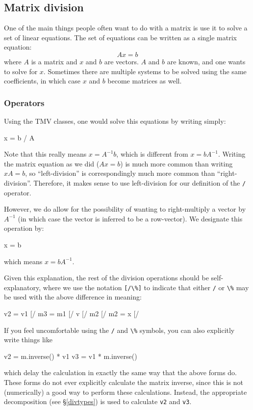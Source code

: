 \documentclass[twoside,letterpaper,11pt]{article}
\renewcommand{\tt}[1]{{\lstinline {#1}}}
\begin{document}
\subsection{Matrix division}
\label{division}

One of the main things people often want to do with a matrix is use it to solve a 
set of linear equations.  The set of equations can be written as a single matrix
equation:
\begin{equation*}
\nonumber
A x = b
\end{equation*}
where $A$ is a matrix and $x$ and $b$ are vectors.  $A$ and $b$ are known, 
and one wants to solve for $x$.  Sometimes there are
multiple systems to be solved using the same coefficients, in which case
$x$ and $b$ become matrices as well.

\subsubsection{Operators}
\label{divops}

Using the TMV classes, one would solve this equations by writing simply:
\begin{tmvcode}
x = b / A
\end{tmvcode}
Note that this really means $x = A^{-1} b$, which is different from $x = b A^{-1}$.
Writing the matrix equation as we did ($A x=b$) is much more common than 
writing $xA=b$, so ``left-division'' is correspondingly much more common than 
``right-division''.  Therefore, it makes sense to use left-division for our definition of the \tt{/}
operator.

However, we do allow for the possibility of wanting to right-multiply a vector
by $A^{-1}$ (in which case the vector is inferred to be a row-vector).  We designate
this operation by:
\begin{tmvcode}
x = b %
\end{tmvcode}
which means $x = b A^{-1}$.

Given this explanation, the rest of the division operations should be self-explanatory,
where we use the notation \tt{[/\%]} to indicate that either \tt{/} or \tt{\%} may
be used with the above difference in meaning:
\begin{tmvcode}
v2 = v1 [/%
m3 = m1 [/%
v [/%
m2 [/%
m2 = x [/%
\end{tmvcode}

If you feel uncomfortable using the \tt{/} and \tt{\%} symbols,
you can also explicitly write things like
\begin{tmvcode}
v2 = m.inverse() * v1
v3 = v1 * m.inverse()
\end{tmvcode}
which delay the calculation in exactly the same way that the above forms do.  
These forms
do not ever explicitly calculate the matrix inverse, since this is not (numerically) a
good way to perform these calculations.  Instead, the appropriate decomposition 
(see \S\ref{divtypes})
is used to calculate \tt{v2} and \tt{v3}.
\end{document}
